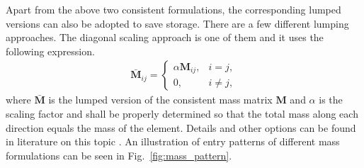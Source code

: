 \documentclass[3p,sort&compress,review,11pt,fleqn]{elsarticle}
\newcommand*{\figref}[1]{Fig.~\ref{#1}}
\newcommand*{\mathbold}[1]{\bm{#1}}
\begin{document}
Apart from the above two consistent formulations, the corresponding lumped versions can also be adopted to save storage. There are a few different lumping approaches. The diagonal scaling approach is one of them and it uses the following expression.
\begin{gather}
\bar{\mathbold{M}}_{ij}=\left\{
\begin{array}{ll}
\alpha{}\mathbold{M}_{ij},&i=j,\\
0,&i\neq{}j,
\end{array}
\right.
\end{gather}
where $\bar{\mathbold{M}}$ is the lumped version of the consistent mass matrix $\mathbold{M}$ and $\alpha$ is the scaling factor and shall be properly determined so that the total mass along each direction equals the mass of the element. Details and other options can be found in literature on this topic \citep[see][]{Chopra2011}. An illustration of entry patterns of different mass formulations can be seen in \figref{fig:mass_pattern}.
\end{document}
